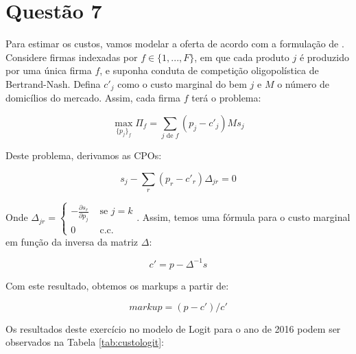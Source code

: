\documentclass{article}
\begin{document}
\section*{Questão 7}

Para estimar os custos, vamos modelar a oferta de acordo com a formulação de . Considere firmas indexadas por $f \in \{1, ..., F\}$, em que cada produto $j$ é produzido por uma única firma $f$, e suponha conduta de competição oligopolística de Bertrand-Nash. Defina $c'_j$ como o custo marginal do bem $j$ e $M$ o número de domicílios do mercado. Assim, cada firma $f$ terá o problema:

$$
\max_{\{p_j\}_f} \Pi_f = \sum\limits_{j\text{ de }f} (p_j - c'_j) M s_j
$$

Deste problema, derivamos as CPOs:

$$
s_j - \sum_r (p_r - c'_r)\Delta_{jr} = 0
$$

Onde $\Delta_{jr} = \begin{cases}-\frac{\partial s_r}{\partial p_j} & \text { se } j=k \\ 0 & \text { c.c. }\end{cases}$. Assim, temos uma fórmula para o custo marginal em função da inversa da matriz $\Delta$:

$$
c' = p - \Delta^{-1}s
$$

Com este resultado, obtemos os markups a partir de:

$$markup =(p - c') / c'$$

Os resultados deste exercício no modelo de Logit para o ano de 2016 podem ser observados na Tabela \ref{tab:custologit}:
\end{document}
